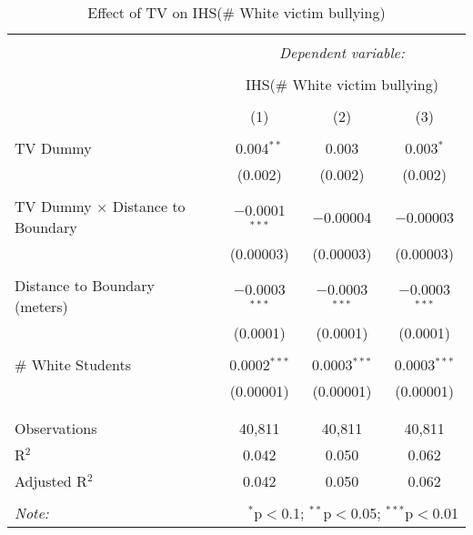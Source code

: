 
\begin{table}[!htbp] \centering 
  \caption{Effect of TV on IHS(\# White victim bullying)} 
  \label{} 
\begin{tabular}{@{\extracolsep{-2pt}}lccc} 
\\[-1.8ex]\hline 
\hline \\[-1.8ex] 
 & \multicolumn{3}{c}{\textit{Dependent variable:}} \\ 
\cline{2-4} 
\\[-1.8ex] & \multicolumn{3}{c}{IHS(\# White victim bullying)} \\ 
\\[-1.8ex] & (1) & (2) & (3)\\ 
\hline \\[-1.8ex] 
 TV Dummy & 0.004$^{**}$ & 0.003 & 0.003$^{*}$ \\ 
  & (0.002) & (0.002) & (0.002) \\ 
  & & & \\ 
 TV Dummy $\times$ Distance to Boundary & $-$0.0001$^{***}$ & $-$0.00004 & $-$0.00003 \\ 
  & (0.00003) & (0.00003) & (0.00003) \\ 
  & & & \\ 
 Distance to Boundary (meters) & $-$0.0003$^{***}$ & $-$0.0003$^{***}$ & $-$0.0003$^{***}$ \\ 
  & (0.0001) & (0.0001) & (0.0001) \\ 
  & & & \\ 
 \# White Students & 0.0002$^{***}$ & 0.0003$^{***}$ & 0.0003$^{***}$ \\ 
  & (0.00001) & (0.00001) & (0.00001) \\ 
  & & & \\ 
\hline \\[-1.8ex] 
Observations & 40,811 & 40,811 & 40,811 \\ 
R$^{2}$ & 0.042 & 0.050 & 0.062 \\ 
Adjusted R$^{2}$ & 0.042 & 0.050 & 0.062 \\ 
\hline 
\hline \\[-1.8ex] 
\textit{Note:}  & \multicolumn{3}{r}{$^{*}$p$<$0.1; $^{**}$p$<$0.05; $^{***}$p$<$0.01} \\ 
\end{tabular} 
\end{table} 
